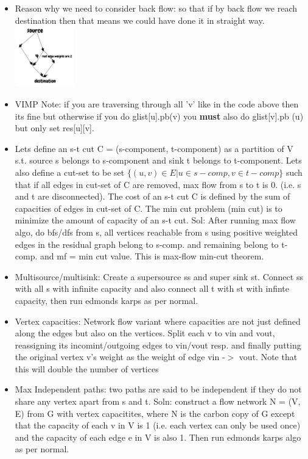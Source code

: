 \documentclass[8pt, a4paper, oneside, twocolumn]{extarticle}
\begin{document}
\begin{itemize}[leftmargin=*]
    \item Reason why we need to consider back flow: so that if by back flow we reach destination then that means we could have done it in straight way. 
    \\\includegraphics[width=0.2\textwidth,height=0.2\textheight,keepaspectratio]{assets/bflow} 
    \item VIMP Note: if you are traversing through all 'v' like in the code above then its fine but otherwise if you do glist[u].pb(v) you \textbf{must} also do glist[v].pb (u) but only set res[u][v].
    \item Lets define an s-t cut C = (s-component, t-component) as a partition of V s.t. source s belongs to s-component and sink t belongs to t-component. Lets also define a cut-set to be set $\{(u, v) \in E | u \in s-comp, v \in t-comp\}$ such that if all edges in cut-set of C are removed, max flow from s to t is 0. (i.e. s and t are disconnected). The cost of an s-t cut C is defined by the sum of capacities of edges in cut-set of C. The min cut problem (min cut) is to minimize the amount of capacity of an s-t cut. Sol: After running max flow algo, do bfs/dfs from s, all vertices reachable from s using positive weighted edges in the residual graph belong to s-comp. and remaining belong to t-comp. and mf = min cut value. This is max-flow min-cut theorem.
    \item Multisource/multisink: Create a supersource ss and super sink st. Connect ss with all s with infinite capacity and also connect all t with st with infinte capacity, then run edmonds karps as per normal.
    \item Vertex capacities: Network flow variant where capacities are not just defined along the edges but also on the vertices. Split each v to vin and vout, reassigning its incomint/outgoing edges to vin/vout resp. and finally putting the original vertex v's weight as the weight of edge vin -$>$ vout. Note that this will double the number of vertices
    \item Max Independent paths: two paths are said to be independent if they do not share any vertex apart from s and t. Soln: construct a flow network N = (V, E) from G with vertex capacitites, where N is the carbon copy of G except that the capacity of each v in V is 1 (i.e. each vertex can only be used once) and the capacity of each edge e in V is also 1. Then run edmonds karps algo as per normal.

\end{itemize}
\end{document}
